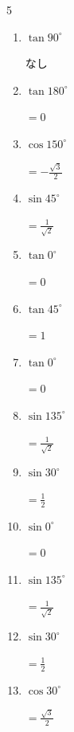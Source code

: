 \begin{multicols}{5}
\begin{enumerate}
        $\displaystyle =-\frac{1}{2}$

  \item $\displaystyle \tan{90^\circ}$

        $\displaystyle なし$

  \item $\displaystyle \tan{180^\circ}$

        $\displaystyle =0$

  \item $\displaystyle \cos{150^\circ}$

        $\displaystyle =-\frac{\sqrt{3}}{2}$

  \item $\displaystyle \sin{45^\circ}$

        $\displaystyle =\frac{1}{\sqrt{2}}$

  \item $\displaystyle \tan{0^\circ}$

        $\displaystyle =0$

  \item $\displaystyle \tan{45^\circ}$

        $\displaystyle =1$

  \item $\displaystyle \tan{0^\circ}$

        $\displaystyle =0$

  \item $\displaystyle \sin{135^\circ}$

        $\displaystyle =\frac{1}{\sqrt{2}}$

  \item $\displaystyle \sin{30^\circ}$

        $\displaystyle =\frac{1}{2}$

  \item $\displaystyle \sin{0^\circ}$

        $\displaystyle =0$

  \item $\displaystyle \sin{135^\circ}$

        $\displaystyle =\frac{1}{\sqrt{2}}$

  \item $\displaystyle \sin{30^\circ}$

        $\displaystyle =\frac{1}{2}$

  \item $\displaystyle \cos{30^\circ}$

        $\displaystyle =\frac{\sqrt{3}}{2}$


\end{enumerate}
\end{multicols}
